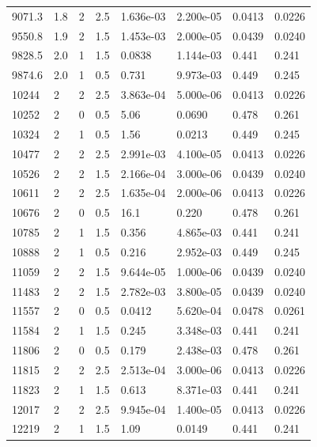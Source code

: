 \documentclass[preview]{standalone}
\begin{document}
{{{\begin{tabular}{L{1.2cm}C{1.2cm} C{0.3cm}C{0.5cm} C{1.4cm}C{1.4cm} C{1.4cm}C{1.4cm}}
  9071.3  &   1.8  & 2     & 2.5 &  1.636e-03  & 2.200e-05  & 0.0413 &  0.0226   \\ 
  9550.8  &   1.9  & 2     & 1.5 &  1.453e-03  & 2.000e-05  & 0.0439 &  0.0240   \\ 
  9828.5  &   2.0  & 1     & 1.5 &  0.0838  & 1.144e-03  & 0.441 &  0.241   \\ 
  9874.6  &   2.0  & 1     & 0.5 &  0.731  & 9.973e-03  & 0.449 &  0.245   \\ 
  10244  &     2  & 2     & 2.5 &  3.863e-04  & 5.000e-06  & 0.0413 &  0.0226   \\ 
  10252  &     2  & 0     & 0.5 &  5.06  & 0.0690  & 0.478 &  0.261   \\ 
  10324  &     2  & 1     & 0.5 &  1.56  & 0.0213  & 0.449 &  0.245   \\ 
  10477  &     2  & 2     & 2.5 &  2.991e-03  & 4.100e-05  & 0.0413 &  0.0226   \\ 
  10526  &     2  & 2     & 1.5 &  2.166e-04  & 3.000e-06  & 0.0439 &  0.0240   \\ 
  10611  &     2  & 2     & 2.5 &  1.635e-04  & 2.000e-06  & 0.0413 &  0.0226   \\ 
  10676  &     2  & 0     & 0.5 &  16.1  & 0.220  & 0.478 &  0.261   \\ 
  10785  &     2  & 1     & 1.5 &  0.356  & 4.865e-03  & 0.441 &  0.241   \\ 
  10888  &     2  & 1     & 0.5 &  0.216  & 2.952e-03  & 0.449 &  0.245   \\ 
  11059  &     2  & 2     & 1.5 &  9.644e-05  & 1.000e-06  & 0.0439 &  0.0240   \\ 
  11483  &     2  & 2     & 1.5 &  2.782e-03  & 3.800e-05  & 0.0439 &  0.0240   \\ 
  11557  &     2  & 0     & 0.5 &  0.0412  & 5.620e-04  & 0.0478 &  0.0261   \\ 
  11584  &     2  & 1     & 1.5 &  0.245  & 3.348e-03  & 0.441 &  0.241   \\ 
  11806  &     2  & 0     & 0.5 &  0.179  & 2.438e-03  & 0.478 &  0.261   \\ 
  11815  &     2  & 2     & 2.5 &  2.513e-04  & 3.000e-06  & 0.0413 &  0.0226   \\ 
  11823  &     2  & 1     & 1.5 &  0.613  & 8.371e-03  & 0.441 &  0.241   \\ 
  12017  &     2  & 2     & 2.5 &  9.945e-04  & 1.400e-05  & 0.0413 &  0.0226   \\ 
  12219  &     2  & 1     & 1.5 &  1.09  & 0.0149  & 0.441 &  0.241   \\ 

\end{tabular}}}}
\end{document}
